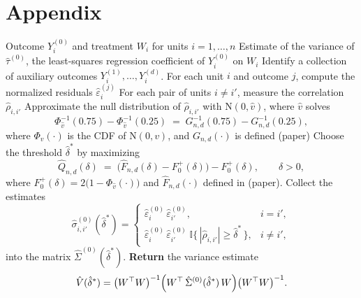 \documentclass[varwidth,bib]{statapress}
\begin{document}
\clearpage
\appendix
\section*{Appendix}



\begin{algorithm}[H]
\caption{Thresholding Multiple Outcomes (TMO)}
\label{alg:TMP}
\begin{algorithmic}[1]
\Require Outcome $Y_i^{(0)}$ and treatment $W_i$ for units $i=1,\ldots,n$
\Ensure Estimate of the variance of $\hat\tau^{(0)}$, the least-squares regression coefficient of $Y_i^{(0)}$ on $W_i$
\State Identify a collection of auxiliary outcomes $Y_i^{(1)},\ldots,Y_i^{(d)}$.
\State For each unit $i$ and outcome $j$, compute the normalized residuals $\hat\varepsilon_i^{(j)}$
\State For each pair of units $i\neq i'$, measure the correlation $\hat\rho_{i,i'}$
\State Approximate the null distribution of $\hat\rho_{i,i'}$ with $\mathrm{N}(0,\hat v)$, where $\hat v$ solves
\[
  \Phi_{\hat v}^{-1}(0.75)-\Phi_{\hat v}^{-1}(0.25)
  \;=\;
  G_{n,d}^{-1}(0.75)-G_{n,d}^{-1}(0.25),
\]
where $\Phi_v(\cdot)$ is the CDF of $\mathrm{N}(0,v)$, and $G_{n,d}(\cdot)$ is defined (paper)
\State Choose the threshold $\hat\delta^{\ast}$ by maximizing
\[
  \hat Q_{n,d}(\delta)
  \;=\;
  \bigl(\hat F_{n,d}(\delta)-F_0^{+}(\delta)\bigr) - F_0^{+}(\delta),
  \qquad \delta>0,
\]
where $F_0^{+}(\delta)=2\bigl(1-\Phi_{\hat v}(\cdot)\bigr)$ and $\hat F_{n,d}(\cdot)$ defined in (paper).
\State Collect the estimates
\[
\hat\sigma^{(0)}_{i,i'}(\hat\delta^{\ast}) =
\begin{cases}
 \hat\varepsilon_i^{(0)}\,\hat\varepsilon_{i'}^{(0)}, & i=i',\\[4pt]
 \hat\varepsilon_i^{(0)}\,\hat\varepsilon_{i'}^{(0)}\;\mathbb{I}\{\,|\hat\rho_{i,i'}|\ge \hat\delta^{\ast}\,\}, & i\neq i',
\end{cases}
\]
into the matrix $\hat\Sigma^{(0)}(\hat\delta^{\ast})$.
\State \textbf{Return} the variance estimate
\[
\hat V(\hat\delta^{\ast})
=
\bigl(W^{\top}W\bigr)^{-1}
\Bigl(W^{\top}\,\hat\Sigma^{(0)}(\hat\delta^{\ast})\,W\Bigr)
\bigl(W^{\top}W\bigr)^{-1}.
\]
\end{algorithmic}
\end{algorithm}
    
    
\end{document}

